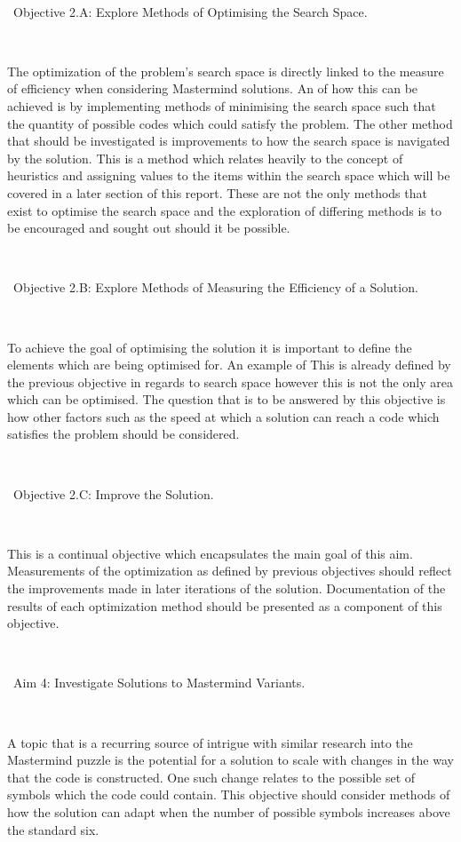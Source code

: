\documentclass[11pt]{article}  %
\theoremstyle{definition}
\theoremstyle{remark}
\begin{document}
\

\textbullet\ Objective 2.A: Explore Methods of Optimising the Search Space.

\

The optimization of the problem's search space is directly linked to the measure of efficiency when considering Mastermind solutions.
An of how this can be achieved is by implementing methods of minimising the search space such that the quantity of possible codes
which could satisfy the problem. The other method that should be investigated is improvements to how the search space
is navigated by the solution. This is a method which relates heavily to the concept of heuristics and assigning values to the items within
the search space which will be covered in a later section of this report. These are not the only methods that exist to optimise the
search space and the exploration of differing methods is to be encouraged and sought out should it be possible.

\

\textbullet\ Objective 2.B: Explore Methods of Measuring the Efficiency of a Solution.

\

To achieve the goal of optimising the solution it is important to define the elements which are being optimised for. An example of
This is already defined by the previous objective in regards to search space however this is not the only area which can be optimised.
The question that is to be answered by this objective is how other factors such as the speed at which a solution can reach a code
which satisfies the problem should be considered.


\

\textbullet\ Objective 2.C: Improve the Solution.

\

This is a continual objective which encapsulates the main goal of this aim. Measurements of the optimization as defined by previous 
objectives should reflect the improvements made in later iterations of the solution. Documentation of the results of each optimization 
method should be presented as a component of this objective.

\

\textbullet\ Aim 4: Investigate Solutions to Mastermind Variants.

\

A topic that is a recurring source of intrigue with similar research into the Mastermind puzzle is the potential for a solution to scale with
changes in the way that the code is constructed. One such change relates to the possible set of symbols which the code could contain.
This objective should consider methods of how the solution can adapt when the number of possible symbols increases above the standard six.
\end{document}
